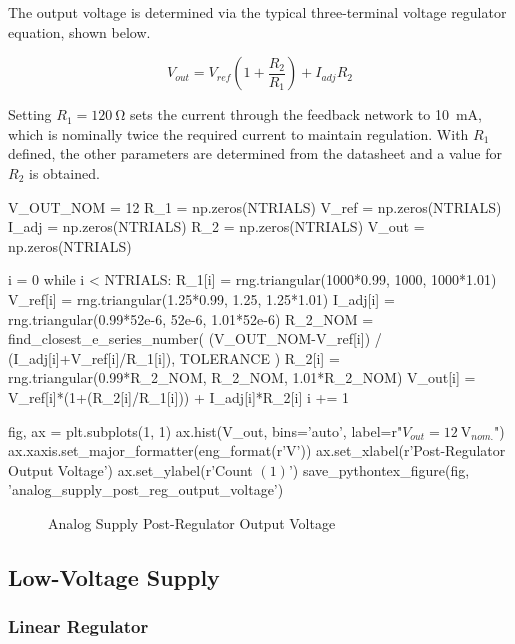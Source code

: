 \documentclass[12pt, titlepage]{/home/air/projects/latex-template/tex-template}
\begin{document}
The output voltage is determined via the typical three-terminal voltage regulator equation, shown below.

$$ V_{out} = V_{ref}\left(1+\frac{R_2}{R_1}\right) + I_{adj}R_2 $$

Setting $R_1=\SI{120}{\ohm}$ sets the current through the feedback network to \SI{10}{\milli\ampere}, which is nominally twice the required current to maintain regulation. With $R_1$ defined, the other parameters are determined from the datasheet and a value for $R_2$ is obtained.

\begin{pycode}
V_OUT_NOM = 12
R_1 = np.zeros(NTRIALS)
V_ref = np.zeros(NTRIALS)
I_adj = np.zeros(NTRIALS)
R_2 = np.zeros(NTRIALS)
V_out = np.zeros(NTRIALS)

i = 0
while i < NTRIALS:
    R_1[i] = rng.triangular(1000*0.99, 1000, 1000*1.01)
    V_ref[i] = rng.triangular(1.25*0.99, 1.25, 1.25*1.01)
    I_adj[i] = rng.triangular(0.99*52e-6, 52e-6, 1.01*52e-6)
    R_2_NOM = find_closest_e_series_number(
        (V_OUT_NOM-V_ref[i]) / (I_adj[i]+V_ref[i]/R_1[i]),
        TOLERANCE
        )
    R_2[i] = rng.triangular(0.99*R_2_NOM, R_2_NOM, 1.01*R_2_NOM)
    V_out[i] = V_ref[i]*(1+(R_2[i]/R_1[i])) + I_adj[i]*R_2[i]
    i += 1

fig, ax = plt.subplots(1, 1)
ax.hist(V_out, bins='auto', label=r"$V_{out}=\SI{12}{\volt}_{nom.}$")
ax.xaxis.set_major_formatter(eng_format(r'\unit{\volt}'))
ax.set_xlabel(r'Post-Regulator Output Voltage')
ax.set_ylabel(r'Count $\left(1\right)$')
save_pythontex_figure(fig, 'analog_supply_post_reg_output_voltage')
\end{pycode}

\begin{figure}[!ht]
    \centering
    
    \caption{Analog Supply Post-Regulator Output Voltage}
\end{figure}

\subsection{Low-Voltage Supply}
\subsubsection{Linear Regulator}
\end{document}
